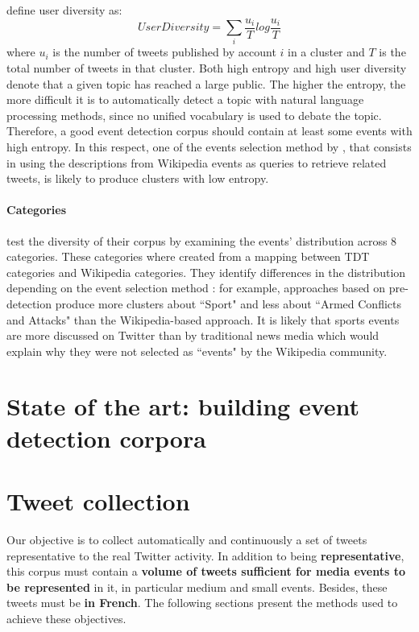		\citet{kumar_tweets_2014} define user diversity as:
		$$
		UserDiversity = \sum_i\frac{u_i}{T}log\frac{u_i}{T}
		$$
		where $u_i$ is the number of tweets published by account $i$ in a cluster and $T$ is the total number of tweets in that cluster. Both high entropy and high user diversity denote that a given topic has reached a large public. The higher the entropy, the more difficult it is to automatically detect a topic with natural language processing methods, since no unified vocabulary is used to debate the topic. Therefore, a good event detection corpus should contain at least some events with high entropy. In this respect, one of the events selection method by \citet{mcminn_building_2013}, that consists in using the descriptions from Wikipedia events as queries to retrieve related tweets, is likely to produce clusters with low entropy. 
		
		\paragraph{\textbf{Categories}}
		\citet{mcminn_building_2013} test the diversity of their corpus by examining the events' distribution across 8 categories. These categories where created from a mapping between TDT categories \citep{allan_introduction_2002} and Wikipedia categories. They identify differences in the distribution depending on the event selection method : for example, approaches based on pre-detection produce more clusters about ``Sport" and less about ``Armed Conflicts and Attacks" than the Wikipedia-based approach. It is likely that sports events are more discussed on Twitter than by traditional news media which would explain why they were not selected as ``events" by the Wikipedia community.


\section{State of the art: building event detection corpora}


\section{Tweet collection}
Our objective is to collect automatically and continuously a set of tweets representative to the real Twitter activity. In addition to being \textbf{representative}, this corpus must contain a \textbf{volume of tweets sufficient for media events to be represented} in it, in particular medium and small events. Besides, these tweets must be \textbf{in French}. The following sections present the methods used to achieve these objectives.
